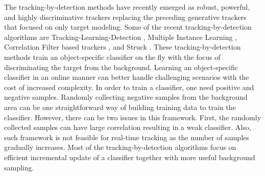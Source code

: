 \documentclass[10pt,twocolumn,letterpaper]{article}
\begin{document}
The tracking-by-detection methods have recently emerged as robust,
powerful, and highly discriminative trackers replacing the preceding
generative trackers that focused on only target modeling. Some of the
recent tracking-by-detection algorithms are
Tracking-Learning-Detection \cite{kalal2012tracking}, Multiple
Instance Learning \cite{babenko2009visual}, Correlation Filter based
trackers \cite{bolme2010visual,henriques2015high}, and Struck
\cite{hare2012efficient}. These tracking-by-detection methods train an
object-specific classifier on the fly with the focus of discriminating
the target from the background. Learning an object-specific classifier
in an online manner can better handle challenging scenarios with the
cost of increased complexity. In order to train a classifier, one need
positive and negative samples. Randomly collecting negative samples
from the background area can be one straightforward way of building
training data to train the classifier. However, there can be two
issues in this framework. First, the randomly collected samples can
have large correlation resulting in a weak classifier. Also, such
framework is not feasible for real-time tracking as the number of
samples gradually increases. Most of the tracking-by-detection
algorithms focus on efficient incremental update of a classifier
together with more useful background sampling.
\end{document}
